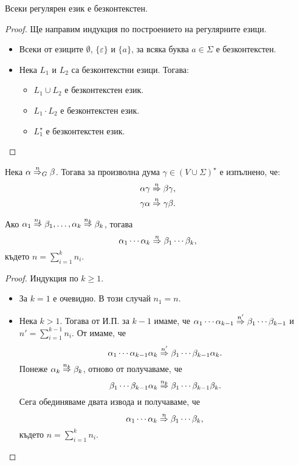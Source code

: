\begin{framed}
  \begin{thm}
    Всеки регулярен език е безконтекстен.
  \end{thm}
\end{framed}
\begin{proof}
  Ще направим индукция по построението на регулярните езици.
  \begin{itemize}
  \item
    Всеки от езиците $\emptyset$, $\{\varepsilon\}$ и $\{a\}$, за всяка буква $a \in \Sigma$ е безконтекстен.
  \item
    Нека $L_1$ и $L_2$ са безконтекстни езици. Тогава:
    \begin{itemize}
    \item
      $L_1 \cup L_2$ е безконтекстен език.
    \item
      $L_1 \cdot L_2$ е безконтекстен език.
    \item
      $L^\star_1$ е безконтекстен език.
    \end{itemize}
  \end{itemize}
\end{proof}

\begin{proposition}
  \label{pr:grammar:add}
  Нека $\alpha \stackrel{{n}}{\Rightarrow}_G \beta$. Тогава за произволна дума $\gamma \in (V \cup \Sigma)^\star$ е изпълнено, че:
  \begin{align*}
    & \alpha\gamma \stackrel{{n}}{\Rightarrow} \beta \gamma,\\
    & \gamma\alpha \stackrel{{n}}{\Rightarrow} \gamma \beta.
  \end{align*}
\end{proposition}

\begin{proposition}
  \label{pr:grammar:concat}
  Ако $\alpha_1 \stackrel{{n_1}}{\Rightarrow} \beta_1, \dots, \alpha_k \stackrel{{n_k}}{\Rightarrow} \beta_k$, тогава
  \[\alpha_1\cdots\alpha_k \stackrel{{n}}{\Rightarrow} \beta_1\cdots\beta_k,\]
  където $n = \sum^k_{i=1} n_i$.
\end{proposition}
\begin{proof}
  Индукция по $k \geq 1$.
  \begin{itemize}
  \item
    За $k = 1$ е очевидно. В този случай $n_1 = n$.
  \item
   Нека $k > 1$. Тогава от И.П. за $k-1$ имаме, че
   $\alpha_1\cdots\alpha_{k-1} \stackrel{{n'}}{\Rightarrow} \beta_1\cdots\beta_{k-1}$ и $n' = \sum^{k-1}_{i=1} n_i$.
   От  имаме, че
   \[\alpha_1\cdots\alpha_{k-1}\alpha_{k} \stackrel{{n'}}{\Rightarrow} \beta_1\cdots\beta_{k-1}\alpha_k.\]
   Понеже $\alpha_k \stackrel{{n_k}}{\Rightarrow} \beta_k$, отново от  получаваме, че
   \[\beta_1\cdots\beta_{k-1}\alpha_k \stackrel{{n_k}}{\Rightarrow} \beta_1 \cdots \beta_{k-1}\beta_k.\]
   Сега обединяваме двата извода и получаваме, че
   \[\alpha_1\cdots\alpha_{k} \stackrel{{n}}{\Rightarrow} \beta_1\cdots\beta_k,\]
   където $n = \sum^k_{i=1} n_i$.
  \end{itemize}
\end{proof}

